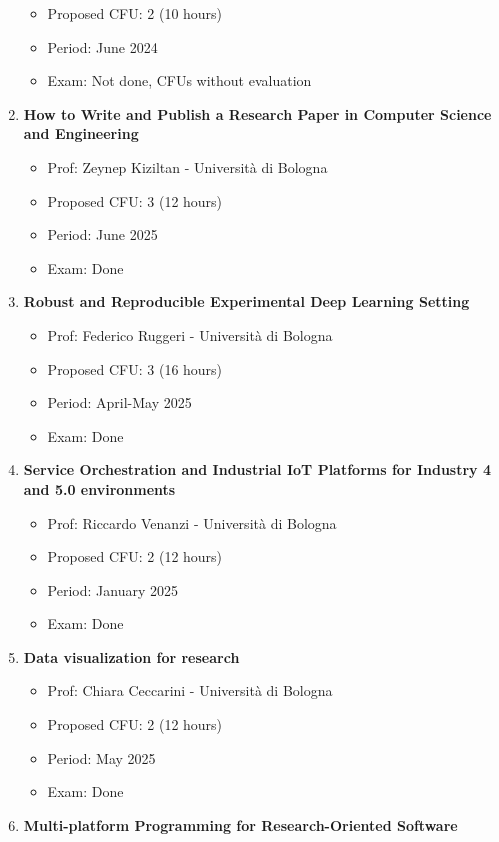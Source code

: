 \documentclass[runningheads]{llncs}
\begin{document}
\begin{enumerate}
\begin{itemize}
        \item Proposed CFU: 2 (10 hours) 
        \item Period: June 2024
        \item Exam: Not done, CFUs without evaluation
    \end{itemize}    
    \item \textbf{How to Write and Publish a Research Paper in Computer Science and Engineering} 
    \begin{itemize}
        \item Prof: Zeynep Kiziltan - Università di Bologna      
        \item Proposed CFU: 3 (12 hours) 
        \item Period: June 2025
        \item Exam: Done
    \end{itemize}  
    \item \textbf{Robust and Reproducible Experimental Deep Learning Setting} 
    \begin{itemize}
        \item Prof: Federico Ruggeri - Università di Bologna      
        \item Proposed CFU: 3 (16 hours) 
        \item Period: April-May 2025
        \item Exam: Done
    \end{itemize} 
    \item \textbf{Service Orchestration and Industrial IoT Platforms for Industry 4 and 5.0 environments} 
    \begin{itemize}
        \item Prof: Riccardo Venanzi - Università di Bologna      
        \item Proposed CFU: 2 (12 hours) 
        \item Period: January 2025
        \item Exam: Done
    \end{itemize} 
    \item \textbf{Data visualization for research} 
    \begin{itemize}
        \item Prof: Chiara Ceccarini - Università di Bologna      
        \item Proposed CFU: 2 (12 hours) 
        \item Period: May 2025
        \item Exam: Done
    \end{itemize} 
    \item \textbf{Multi-platform Programming for Research-Oriented Software} 

\end{enumerate}
\end{document}

